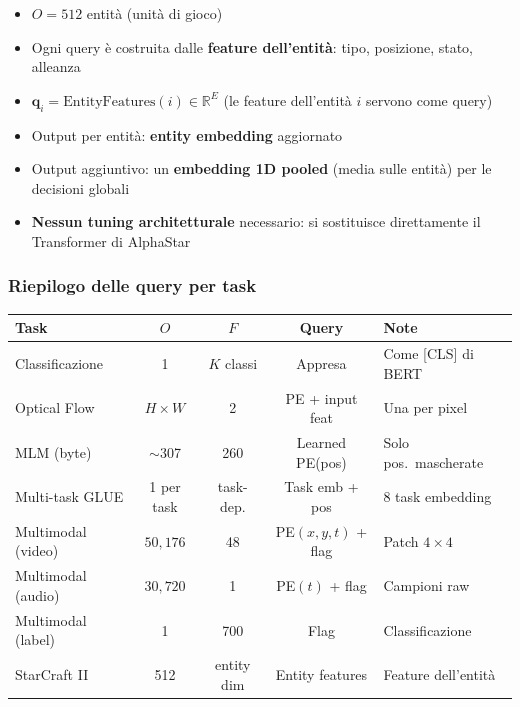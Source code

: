 \documentclass[12pt,a4paper]{article}
\begin{document}
\begin{formulabox}
\begin{itemize}
    \item $O = 512$ entit\`a (unit\`a di gioco)
    \item Ogni query \`e costruita dalle \textbf{feature dell'entit\`a}: tipo, posizione, stato, alleanza
    \item $\mathbf{q}_i = \text{EntityFeatures}(i) \in \mathbb{R}^E$ (le feature dell'entit\`a $i$ servono come query)
    \item Output per entit\`a: \textbf{entity embedding} aggiornato
    \item Output aggiuntivo: un \textbf{embedding 1D pooled} (media sulle entit\`a) per le decisioni globali
    \item \textbf{Nessun tuning architetturale} necessario: si sostituisce direttamente il Transformer di AlphaStar
\end{itemize}
\end{formulabox}

\subsubsection{Riepilogo delle query per task}

\begin{center}
\begin{tabular}{p{2.8cm}cccp{3.5cm}}
\toprule
\textbf{Task} & \textbf{$O$} & \textbf{$F$} & \textbf{Query} & \textbf{Note} \\
\midrule
Classificazione & 1 & $K$ classi & Appresa & Come [CLS] di BERT \\
Optical Flow & $H \times W$ & 2 & PE + input feat & Una per pixel \\
MLM (byte) & $\sim$307 & 260 & Learned PE(pos) & Solo pos.\ mascherate \\
Multi-task GLUE & 1 per task & task-dep. & Task emb + pos & 8 task embedding \\
Multimodal (video) & $50{,}176$ & 48 & PE$(x,y,t)$ + flag & Patch $4 \times 4$ \\
Multimodal (audio) & $30{,}720$ & 1 & PE$(t)$ + flag & Campioni raw \\
Multimodal (label) & 1 & 700 & Flag & Classificazione \\
StarCraft II & 512 & entity dim & Entity features & Feature dell'entit\`a \\
\bottomrule
\end{tabular}
\end{center}
\end{document}
